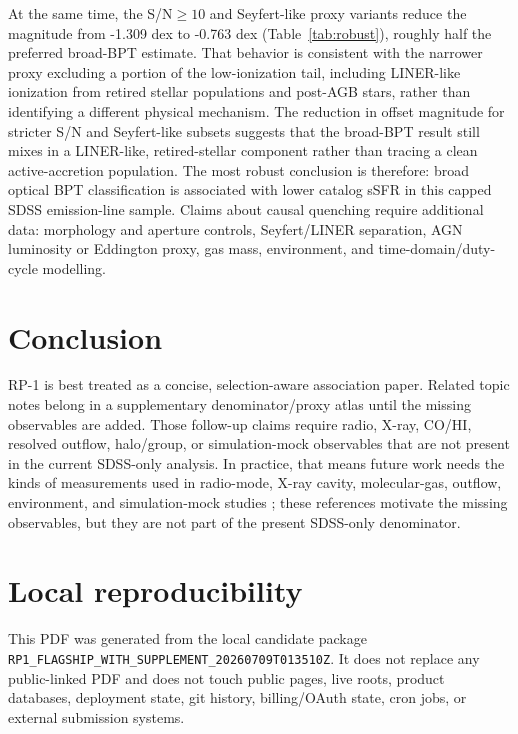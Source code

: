 \documentclass[twocolumn]{aastex631}
\begin{document}
At the same time, the S/N$\geq10$ and Seyfert-like proxy variants reduce the magnitude from -1.309 dex to -0.763 dex (Table~\ref{tab:robust}), roughly half the preferred broad-BPT estimate. That behavior is consistent with the narrower proxy excluding a portion of the low-ionization tail, including LINER-like ionization from retired stellar populations and post-AGB stars, rather than identifying a different physical mechanism. The reduction in offset magnitude for stricter S/N and Seyfert-like subsets suggests that the broad-BPT result still mixes in a LINER-like, retired-stellar component rather than tracing a clean active-accretion population. The most robust conclusion is therefore: broad optical BPT classification is associated with lower catalog sSFR in this capped SDSS emission-line sample. Claims about causal quenching require additional data: morphology and aperture controls, Seyfert/LINER separation, AGN luminosity or Eddington proxy, gas mass, environment, and time-domain/duty-cycle modelling.

\section{Conclusion}
RP-1 is best treated as a concise, selection-aware association paper. Related topic notes belong in a supplementary denominator/proxy atlas until the missing observables are added. Those follow-up claims require radio, X-ray, CO/HI, resolved outflow, halo/group, or simulation-mock observables that are not present in the current SDSS-only analysis.
In practice, that means future work needs the kinds of measurements used in radio-mode, X-ray cavity, molecular-gas, outflow, environment, and simulation-mock studies \citep{best2005,dekel2006,fabian2012,heckmanbest2014,lamassa2013,mcnamara2007,veilleux2005,xcoldgass2017,xgass2018,cicone2014,carniani2017,fiore2017,simba2019,tng2019,eagle2015,peng2010,piotrowska2022,wetzel2013}; these references motivate the missing observables, but they are not part of the present SDSS-only denominator.

\section{Local reproducibility}
This PDF was generated from the local candidate package \texttt{RP1\_FLAGSHIP\_WITH\_SUPPLEMENT\_20260709T013510Z}. It does not replace any public-linked PDF and does not touch public pages, live roots, product databases, deployment state, git history, billing/OAuth state, cron jobs, or external submission systems.
\end{document}
